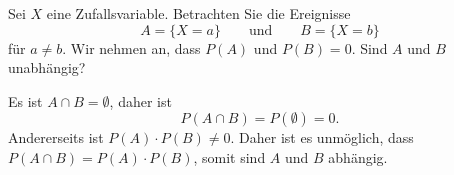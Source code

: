 Sei $X$ eine Zufallsvariable.
Betrachten Sie die Ereignisse
\[
A=\{X=a\}
\qquad\text{und}\qquad
B=\{X=b\}
\]
für $a\ne b$.
Wir nehmen an, dass $P(A)$ und $P(B)=0$.
Sind $A$ und $B$ unabhängig?

\begin{loesung}
Es ist $A\cap B=\emptyset$, daher ist
\[
P(A\cap B)
=
P(\emptyset)
=
0.
\]
Andererseits ist $P(A)\cdot P(B)\ne 0$.
Daher ist es unmöglich, dass $P(A\cap B)=P(A)\cdot P(B)$, somit sind
$A$ und $B$ abhängig.
\end{loesung}
